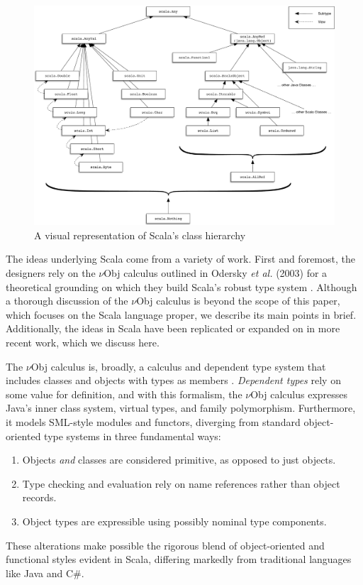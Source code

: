 \documentclass[jou,apacite]{IEEEtran}
\begin{document}
\begin{figure}[h]
  \centering
  \includegraphics[width=0.9\linewidth]{scala_classes}
  \caption{A visual representation of Scala's class hierarchy}
  \label{fig:scala-classes}
\end{figure} 

The ideas underlying Scala come from a variety of work. First and foremost, the
designers rely on the $\nu$Obj calculus outlined in Odersky \emph{et al.}
(2003) for a theoretical grounding on which they build Scala's robust type
system \cite{odersky_nominal_2003}. Although a thorough discussion of the
$\nu$Obj calculus is beyond the scope of this paper, which focuses on the Scala
language proper, we describe its main points in brief. Additionally, the ideas
in Scala have been replicated or expanded on in more recent work, which we
discuss here.

The $\nu$Obj calculus is, broadly, a calculus and dependent type system that
includes classes and objects with types as members
\cite{odersky_nominal_2003}. \emph{Dependent types} rely on some value for
definition, and with this formalism, the $\nu$Obj calculus expresses Java's
inner class system, virtual types, and family polymorphism. Furthermore, it
models SML-style modules and functors, diverging from standard object-oriented
type systems in three fundamental ways:
\begin{enumerate}
\item Objects \emph{and} classes are considered primitive, as opposed to just
  objects.
\item Type checking and evaluation rely on name references rather than object
  records.                     %
\item Object types are expressible using possibly nominal type components.
\end{enumerate}
These alterations make possible the rigorous blend of object-oriented and
functional styles evident in Scala, differing markedly from traditional
languages like Java and C\#.
\end{document}
